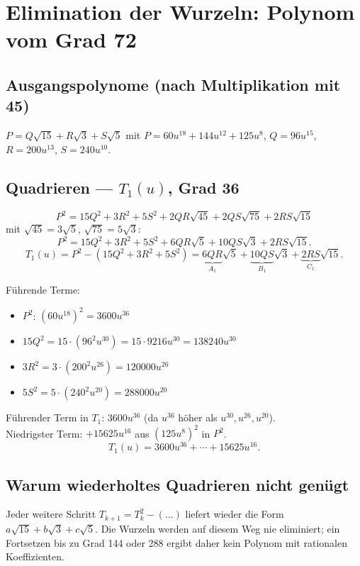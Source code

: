 \section{Elimination der Wurzeln: Polynom vom Grad 72}


\subsection{Ausgangspolynome (nach Multiplikation mit 45)}

$P=Q\sqrt{15}+R\sqrt{3}+S\sqrt{5}$ mit
$P=60u^{18}+144u^{12}+125u^8$,
$Q=96u^{15}$, $R=200u^{13}$, $S=240u^{10}$.

\subsection{Quadrieren — $T_1(u)$, Grad 36}

\[
  P^2 = 15Q^2+3R^2+5S^2+2QR\sqrt{45}+2QS\sqrt{75}+2RS\sqrt{15}
\]
mit $\sqrt{45}=3\sqrt{5}$, $\sqrt{75}=5\sqrt{3}$:
\[
  P^2 = 15Q^2+3R^2+5S^2+6QR\sqrt{5}+10QS\sqrt{3}+2RS\sqrt{15}.
\]
\[
  T_1(u) = P^2-(15Q^2+3R^2+5S^2)
  = \underbrace{6QR}_{A_1}\sqrt{5}+\underbrace{10QS}_{B_1}\sqrt{3}
  +\underbrace{2RS}_{C_1}\sqrt{15}.
\]

Führende Terme:
\begin{itemize}
  \item $P^2$: $(60u^{18})^2=3600u^{36}$
  \item $15Q^2=15\cdot(96^2u^{30})=15\cdot9216u^{30}=138240u^{30}$
  \item $3R^2=3\cdot(200^2u^{26})=120000u^{26}$
  \item $5S^2=5\cdot(240^2u^{20})=288000u^{20}$
\end{itemize}
Führender Term in $T_1$: $3600u^{36}$ (da $u^{36}$ höher als $u^{30},u^{26},u^{20}$).\\
Niedrigster Term: $+15625u^{16}$ aus $(125u^8)^2$ in $P^2$.
\[
  T_1(u) = 3600u^{36}+\cdots+15625u^{16}.
\]

\subsection{Warum wiederholtes Quadrieren nicht genügt}

Jeder weitere Schritt $T_{k+1}=T_k^2-(\ldots)$ liefert wieder die Form
$a\sqrt{15}+b\sqrt{3}+c\sqrt{5}$. Die Wurzeln werden auf diesem Weg nie
eliminiert; ein Fortsetzen bis zu Grad 144 oder 288 ergibt daher kein
Polynom mit rationalen Koeffizienten.

